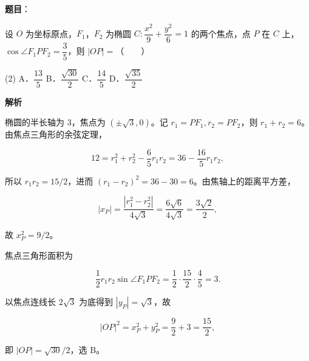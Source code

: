 \begin{answer}

\textbf{题目}：

设 $O$ 为坐标原点，$F_1$，$F_2$ 为椭圆 $C:\dfrac{x^2}{9}+\dfrac{y^2}{6}=1$ 的两个焦点，点 $P$ 在 $C$ 上，$\cos\angle F_1PF_2=\dfrac35$，则 $|OP|=$\mbox{（　　）}

\begin{gkopts}(2)
\task A．$\dfrac{13}{5}$
\task B．$\dfrac{\sqrt{30}}2$
\task C．$\dfrac{14}{5}$
\task D．$\dfrac{\sqrt{35}}2$
\end{gkopts}

\textbf{解析}

椭圆的半长轴为 $3$，焦点为 $(\pm\sqrt3,0)$。记 $r_1=PF_1,r_2=PF_2$，则 $r_1+r_2=6$。由焦点三角形的余弦定理，

\nopagebreak[4]
\[
12=r_1^2+r_2^2-\frac65r_1r_2
=36-\frac{16}{5}r_1r_2,
\]

所以 $r_1r_2=15/2$，进而 $(r_1-r_2)^2=36-30=6$。由焦轴上的距离平方差，

\nopagebreak[4]
\[
|x_P|=\frac{|r_1^2-r_2^2|}{4\sqrt3}
=\frac{6\sqrt6}{4\sqrt3}=\frac{3\sqrt2}{2},
\]

故 $x_P^2=9/2$。

焦点三角形面积为

\nopagebreak[4]
\[
\frac12r_1r_2\sin\angle F_1PF_2
=\frac12\cdot\frac{15}{2}\cdot\frac45=3.
\]

以焦点连线长 $2\sqrt3$ 为底得到 $|y_P|=\sqrt3$，故

\nopagebreak[4]
\[
|OP|^2=x_P^2+y_P^2=\frac92+3=\frac{15}{2},
\]

即 $|OP|=\sqrt{30}/2$，选 B。


\par\medskip

\end{answer}

